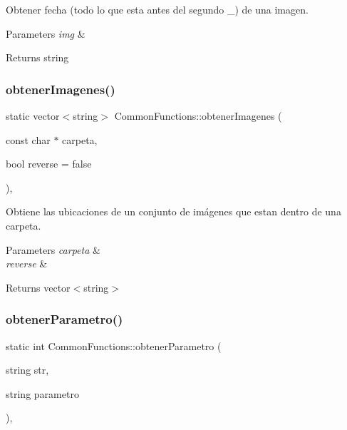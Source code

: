 Obtener fecha (todo lo que esta antes del segundo \+\_\+) de una imagen. 


\begin{DoxyParams}{Parameters}
{\em img} & \\
\hline
\end{DoxyParams}
\begin{DoxyReturn}{Returns}
string 
\end{DoxyReturn}
\mbox{\label{classCommonFunctions_a79ab98672a5297e53ea032a9ecf7ec02}} 
\subsubsection{\texorpdfstring{obtener\+Imagenes()}{obtenerImagenes()}}
{\footnotesize\ttfamily static vector$<$string$>$ Common\+Functions\+::obtener\+Imagenes (\begin{DoxyParamCaption}\item[{const char $\ast$}]{carpeta,  }\item[{bool}]{reverse = {\ttfamily false} }\end{DoxyParamCaption})\hspace{0.3cm}{\ttfamily [inline]}, {\ttfamily [static]}}



Obtiene las ubicaciones de un conjunto de imágenes que estan dentro de una carpeta. 


\begin{DoxyParams}{Parameters}
{\em carpeta} & \\
\hline
{\em reverse} & \\
\hline
\end{DoxyParams}
\begin{DoxyReturn}{Returns}
vector$<$string$>$ 
\end{DoxyReturn}
\mbox{\label{classCommonFunctions_adb7c245caab42a6dc8f484527dd2d447}} 
\subsubsection{\texorpdfstring{obtener\+Parametro()}{obtenerParametro()}}
{\footnotesize\ttfamily static int Common\+Functions\+::obtener\+Parametro (\begin{DoxyParamCaption}\item[{string}]{str,  }\item[{string}]{parametro }\end{DoxyParamCaption})\hspace{0.3cm}{\ttfamily [inline]}, {\ttfamily [static]}}



